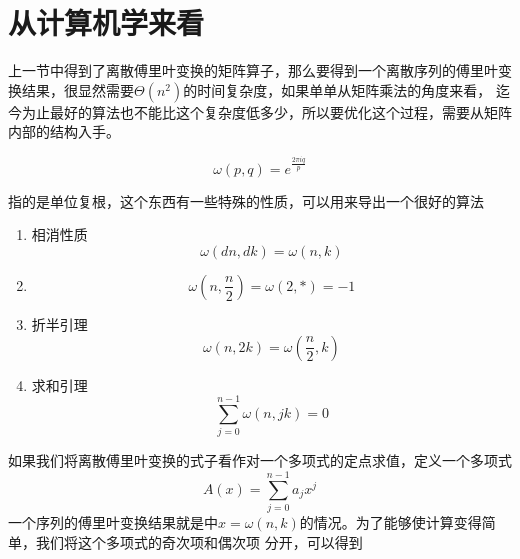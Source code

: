     \section{从计算机学来看}
        上一节中得到了离散傅里叶变换的矩阵算子，那么要得到一个离散序列的傅里叶变换结果，很显然需要$\Theta(n^2)$的时间复杂度，如果单单从矩阵乘法的角度来看，%
        迄今为止最好的算法也不能比这个复杂度低多少，所以要优化这个过程，需要从矩阵内部的结构入手。
        \begin{definition}
            \begin{equation}
                \omega(p, q) = e^{\frac{2\pi i q}{p}}
                \label{eq: 4.4}
            \end{equation}
        \end{definition}
        指的是单位复根，这个东西有一些特殊的性质，可以用来导出一个很好的算法
        \begin{enumerate}
            \item{相消性质}
            \begin{equation}
                \omega(dn, dk) = \omega(n, k)
                \label{eq: 4.5}
            \end{equation}
            \item
            \begin{equation}
                \omega(n, \frac n 2) = \omega(2, *) = -1
                \label{eq: 4.6}
            \end{equation}
            \item{折半引理}
            \begin{equation}
                \omega(n, 2k) = \omega(\frac n 2, k)
                \label{eq: 4.6}
            \end{equation}
            \item{求和引理}
            \begin{equation}
                \sum_{j = 0}^{n - 1} \omega(n, jk) = 0
                \label{eq: 4.7}
            \end{equation}
        \end{enumerate}
        如果我们将离散傅里叶变换的式子看作对一个多项式的定点求值，定义一个多项式
        \begin{equation}
            A(x) = \sum_{j = 0}^{n - 1} a_jx^j
            \label{eq: 4.8}
        \end{equation}
        一个序列的傅里叶变换结果就是中$x = \omega(n, k)$的情况。为了能够使计算变得简单，我们将这个多项式的奇次项和偶次项%
        分开，可以得到
